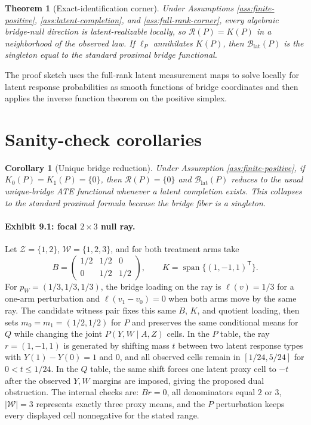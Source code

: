 \documentclass[11pt]{article}
\newcommand{\transpose}{\mathsf{T}}
\newcommand{\calR}{\mathcal{R}}
\theoremstyle{definition}
\theoremstyle{plain}
\newtheorem{theorem}{Theorem}
\newtheorem{corollary}{Corollary}
\theoremstyle{remark}
\begin{document}
\begin{theorem}[Exact-identification corner]\label{thm:corner}
Under Assumptions \ref{ass:finite-positive}, \ref{ass:latent-completion}, and \ref{ass:full-rank-corner}, every algebraic bridge-null direction is latent-realizable locally, so \(\calR(P)=K(P)\) in a neighborhood of the observed law. If \(\ell_P\) annihilates \(K(P)\), then \(\mathcal{B}_{\mathrm{lat}}(P)\) is the singleton equal to the standard proximal bridge functional.
\end{theorem}
The proof sketch uses the full-rank latent measurement maps to solve locally for latent response probabilities as smooth functions of bridge coordinates and then applies the inverse function theorem on the positive simplex.

\section{Sanity-check corollaries}
\begin{corollary}[Unique bridge reduction]\label{cor:unique}
Under Assumption \ref{ass:finite-positive}, if \(K_0(P)=K_1(P)=\{0\}\), then \(\calR(P)=\{0\}\) and \(\mathcal{B}_{\mathrm{lat}}(P)\) reduces to the usual unique-bridge ATE functional whenever a latent completion exists. This collapses to the standard proximal formula because the bridge fiber is a singleton.
\end{corollary}

\paragraph{Exhibit 9.1: focal \(2\times3\) null ray.}
Let \(\mathcal{Z}=\{1,2\}\), \(\mathcal{W}=\{1,2,3\}\), and for both treatment arms take
\[
B=\begin{pmatrix}
1/2&1/2&0\\
0&1/2&1/2
\end{pmatrix},\qquad
K=\operatorname{span}\{(1,-1,1)^\transpose\}.
\]
For \(p_W=(1/3,1/3,1/3)\), the bridge loading on the ray is \(\ell(v)=1/3\) for a one-arm perturbation and \(\ell(v_1-v_0)=0\) when both arms move by the same ray. The candidate witness pair fixes this same \(B\), \(K\), and quotient loading, then sets \(m_0=m_1=(1/2,1/2)\) for \(P\) and preserves the same conditional means for \(Q\) while changing the joint \(P(Y,W\mid A,Z)\) cells. In the \(P\) table, the ray \(r=(1,-1,1)\) is generated by shifting mass \(t\) between two latent response types with \(Y(1)-Y(0)=1\) and \(0\), and all observed cells remain in \([1/24,5/24]\) for \(0<t\le 1/24\). In the \(Q\) table, the same shift forces one latent proxy cell to \(-t\) after the observed \(Y,W\) margins are imposed, giving the proposed dual obstruction. The internal checks are: \(B r=0\), all denominators equal \(2\) or \(3\), \(|\mathcal{W}|=3\) represents exactly three proxy means, and the \(P\) perturbation keeps every displayed cell nonnegative for the stated range.
\end{document}
